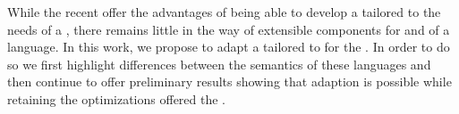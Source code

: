 

%
%
%

While the recent \vmframeworks{} offer the advantages of being able to develop a \vm{} tailored to the needs of a \languageDevs{}, there remains little in the way of extensible components for \translating{} and \visiting{} \irs{} of a language. In this work, we propose to adapt a \vm{} tailored to \Newspeak{} for the \GracePL{}. In order to do so we first highlight differences between the semantics of these languages and then continue to offer preliminary results showing that adaption is possible while retaining the optimizations offered the \vmframework{}. 

% 
%


